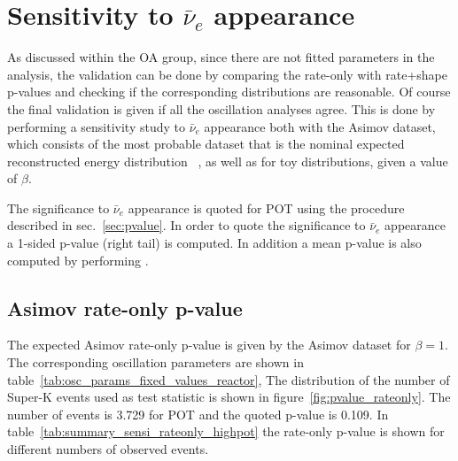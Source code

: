\clearpage


\section {Sensitivity to $\bar{\nu}_e$ appearance}
\label{sec:sensitivity}

As discussed within the OA group, 
since there are not fitted parameters in the analysis, the validation can 
be done by comparing the rate-only with rate+shape p-values and 
checking if the corresponding distributions are reasonable.
Of course the final validation is given if all the oscillation analyses agree.
This is done by performing a sensitivity study to $\bar{\nu}_e$ appearance
both with the Asimov dataset, which consists of the most probable dataset
that is the nominal expected reconstructed energy distribution ~\cite{Asimov},
as well as for toy distributions, given a value of $\beta$.

The significance to $\bar{\nu}_e$ appearance is quoted for 
\TotalPot POT
using the procedure described in sec.~\ref{sec:pvalue}.
In order to quote the significance to $\bar{\nu}_e$ appearance a 1-sided p-value (right tail) is computed.
In addition a mean p-value is also computed by performing \NumToysLarge.


\subsection {Asimov rate-only p-value}
\label{subsec:rateonly}

The expected Asimov rate-only p-value is given by the Asimov dataset for $\beta=1$. 
The corresponding oscillation parameters are shown in table~\ref{tab:osc_params_fixed_values_reactor},
The distribution of the number of Super-K events used as test statistic is shown in figure~\ref{fig:pvalue_rateonly}. 
The number of events is
3.729 for \TotalPot POT
and the quoted p-value is 0.109.
In table~\ref{tab:summary_sensi_rateonly_highpot} the rate-only p-value is shown
for different numbers of observed events.

